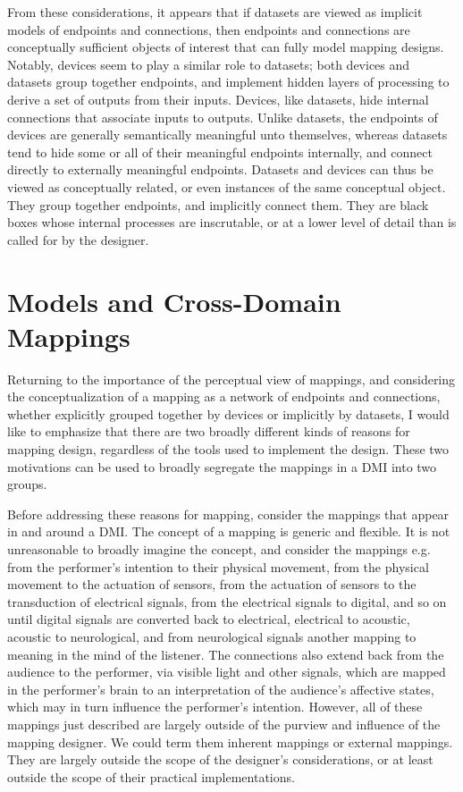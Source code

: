 \documentclass[main.tex]{subfiles}
\begin{document}
From these considerations, it appears that if datasets are viewed as implicit
models of endpoints and connections, then endpoints and connections are
conceptually sufficient objects of interest that can fully model mapping
designs. Notably, devices seem to play a similar role to datasets; both devices
and datasets group together endpoints, and implement hidden layers of
processing to derive a set of outputs from their inputs. Devices, like
datasets, hide internal connections that associate inputs to outputs. Unlike
datasets, the endpoints of devices are generally semantically meaningful unto
themselves, whereas datasets tend to hide some or all of their meaningful
endpoints internally, and connect directly to externally meaningful endpoints.
Datasets and devices can thus be viewed as conceptually related, or even
instances of the same conceptual object. They group together endpoints, and
implicitly connect them. They are black boxes whose internal processes are
inscrutable, or at a lower level of detail than is called for by the designer.

\section{Models and Cross-Domain Mappings}

Returning to the importance of the perceptual view of mappings, and considering
the conceptualization of a mapping as a network of endpoints and connections,
whether explicitly grouped together by devices or implicitly by datasets,
I would like to emphasize that there are two broadly different kinds of reasons
for mapping design, regardless of the tools used to implement the design.  These
two motivations can be used to broadly segregate the mappings in a DMI into
two groups.

Before addressing these reasons for mapping, consider the mappings that appear
in and around a DMI. The concept of a mapping is generic and flexible. It is
not unreasonable to broadly imagine the concept, and consider the mappings e.g.
from the performer's intention to their physical movement, from the physical
movement to the actuation of sensors, from the actuation of sensors to the
transduction of electrical signals, from the electrical signals to digital, and
so on until digital signals are converted back to electrical, electrical to
acoustic, acoustic to neurological, and from neurological signals another
mapping to meaning in the mind of the listener. The connections also extend
back from the audience to the performer, via visible light and other signals,
which are mapped in the performer's brain to an interpretation of the
audience's affective states, which may in turn influence the performer's
intention. However, all of these mappings just described are largely outside of
the purview and influence of the mapping designer. We could term them inherent
mappings or external mappings. They are largely outside the scope of the
designer's considerations, or at least outside the scope of their practical
implementations.
\end{document}
